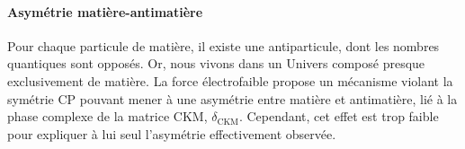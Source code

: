 \paragraph{Asymétrie matière-antimatière}
Pour chaque particule de matière, il existe une antiparticule, dont les nombres quantiques sont opposés.
Or, nous vivons dans un Univers composé presque exclusivement de matière.
La force électrofaible propose un mécanisme violant la symétrie CP pouvant mener à une asymétrie entre matière et antimatière, lié à la phase complexe de la matrice CKM, $\delta_{\text{CKM}}$.
Cependant, cet effet est trop faible pour expliquer à lui seul l'asymétrie effectivement observée.
